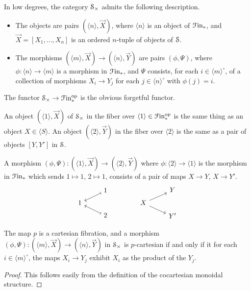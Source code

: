 \documentclass[main.tex]{subfiles}
\begin{document}
In low degrees, the category $\S_{\times}$ admits the following description.
\begin{itemize}
  \item The objects are pairs $(\langle n \rangle, \vec{X})$, where $\langle n \rangle$ is an object of $\Finp$, and $\vec{X} = [X_{1}, \ldots, X_{n}]$ is an ordered $n$-tuple of objects of $\S$.

  \item The morphisms $(\langle m \rangle, \vec{X}) \to (\langle n \rangle, \vec{Y})$ are pairs $(\phi, \Psi)$, where $\phi\colon \langle n \rangle \to \langle m \rangle$ is a morphism in $\Finp$, and $\Psi$ consists, for each $i \in \langle m \rangle^{\circ}$, of a collection of morphisms $X_{i} \to Y_{j}$ for each $j \in \langle n \rangle^{\circ}$ with $\phi(j) = i$.
\end{itemize}

The functor $\S_{\times} \to \Finp\op$ is the obvious forgetful functor.

\begin{example}
  \label{eg:morphisms_in_cocartesian_monoidal_structure_on_spaces}
  An object $(\langle 1 \rangle, \vec{X})$ of $\S_{\times}$ in the fiber over $\langle 1 \rangle \in \Finp\op$ is the same thing as an object $X \in \langle S \rangle$. An object $( \langle 2 \rangle, \vec{Y})$ in the fiber over $\langle 2 \rangle$ is the same as a pair of objects $[Y, Y']$ in $\S$.

  A morphism $(\phi, \Psi)\colon (\langle 1 \rangle, \vec{X}) \to (\langle 2 \rangle, \vec{Y})$ where $\phi\colon \langle 2 \rangle \to \langle 1 \rangle$ is the morphism in $\Finp$ which sends $1 \mapsto 1$, $2 \mapsto 1$, consists of a pair of maps $X \to Y$, $X \to Y'$.
  \begin{equation*}
    \begin{tikzcd}[row sep=tiny]
      & 1
      \arrow[dl, mapsto]
      \\
      1
      \\
      & 2
      \arrow[ul, mapsto]
    \end{tikzcd}
    \qquad\qquad
    \begin{tikzcd}[row sep=tiny]
      & Y
      \\
      X
      \arrow[ur]
      \arrow[dr]
      \\
      & Y'
    \end{tikzcd}
  \end{equation*}
\end{example}

\begin{lemma}
  The map $p$ is a cartesian fibration, and a morphism $(\phi, \Psi)\colon (\langle m \rangle, \vec{X}) \to (\langle n \rangle, \vec{Y})$ in $\S_{\times}$ is $p$-cartesian if and only if it for each $i \in \langle m \rangle^{\circ}$, the maps $X_{i} \to Y_{j}$ exhibit $X_{i}$ as the product of the $Y_{j}$.
\end{lemma}
\begin{proof}
  This follows easily from the definition of the cocartesian monoidal structure.
\end{proof}
\end{document}
